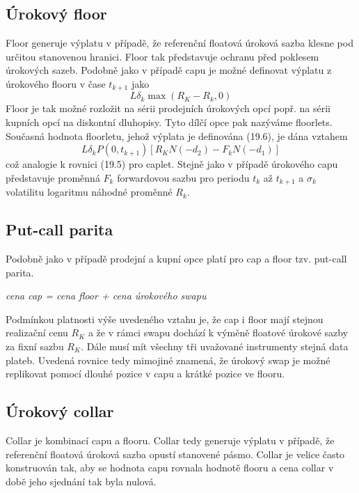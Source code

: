 \documentclass[a4paper]{book}
\begin{document}
\subsection{Úrokový floor}

Floor generuje výplatu v případě, že referenční floatová úroková sazba klesne pod určitou stanovenou hranici. Floor tak představuje ochranu před poklesem úrokových sazeb. Podobně jako v případě capu je možné definovat výplatu z úrokového flooru v čase $t_{k+1}$ jako
\begin{equation}
L \delta_k \max(R_K - R_k, 0)
\end{equation}
Floor je tak možné rozložit na sérii prodejních úrokových opcí popř. na sérii kupních opcí na diskontní dluhopisy. Tyto dílčí opce pak nazýváme floorlets.
Současná hodnota floorletu, jehož výplata je definována (19.6), je dána vztahem
\begin{equation}
L \delta_k P(0,t_{k+1})[R_KN(-d_2)-F_kN(-d_1)]
\end{equation}
což analogie k  rovnici (19.5) pro caplet. Stejně jako v případě úrokového capu představuje proměnná $F_k$ forwardovou sazbu pro periodu $t_k$ až $t_{k+1}$ a $\sigma_k$ volatilitu logaritmu náhodné proměnné $R_k$.

\subsection{Put-call parita}

Podobně jako v případě prodejní a kupní opce platí pro cap a floor tzv. put-call parita.
\begin{center}
\textit{cena cap = cena floor + cena úrokového swapu} 
\end{center}
Podmínkou platnosti výše uvedeného vztahu je, že cap i floor mají stejnou realizační cenu $R_K$ a že v rámci swapu dochází k výměně floatové úrokové sazby za fixní sazbu $R_K$. Dále musí mít všechny tři uvažované instrumenty stejná data plateb. Uvedená rovnice tedy mimojiné znamená, že úrokový swap je možné replikovat pomocí dlouhé pozice v capu a krátké pozice ve flooru.

\subsection{Úrokový collar}

Collar je kombinací capu a flooru. Collar tedy generuje výplatu v případě, že referenční floatová úroková sazba opustí stanovené pásmo. Collar je velice často konstruován tak, aby se hodnota capu rovnala hodnotě flooru a cena collar v době jeho sjednání tak byla nulová.
\end{document}
